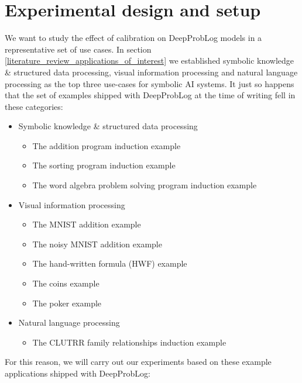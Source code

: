 \section{Experimental design and setup}
\label{experimental_design_and_setup_section}
We want to study the effect of calibration on DeepProbLog models in a representative set of use cases. In section \ref{literature_review_applications_of_interest} we established symbolic knowledge \& structured data processing, visual information processing and natural language processing as the top three use-cases for symbolic AI systems. It just so happens that the set of examples shipped with DeepProbLog at the time of writing fell in these categories:
\begin{itemize}
  \item Symbolic knowledge \& structured data processing
    \begin{itemize}
      \item The addition program induction example
      \item The sorting program induction example
      \item The word algebra problem solving program induction example
    \end{itemize}
  \item Visual information processing
    \begin{itemize}
      \item The MNIST addition example
      \item The noisy MNIST addition example
      \item The hand-written formula (HWF) example
      \item The coins example
      \item The poker example
    \end{itemize}
  \item Natural language processing
    \begin{itemize}
      \item The CLUTRR family relationships induction example
    \end{itemize}
\end{itemize}
For this reason, we will carry out our experiments based on these example applications shipped with DeepProbLog:
